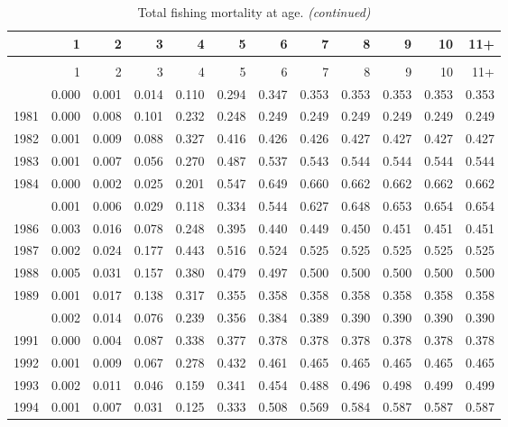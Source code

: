 \documentclass[
]{article}
\begin{document}
\begin{longtable}[t]{lrrrrrrrrrrr}
\caption{\label{tab:FAA-tot-table}Total fishing mortality at age.}\\
\toprule
  & 1 & 2 & 3 & 4 & 5 & 6 & 7 & 8 & 9 & 10 & 11+\\
\midrule
\endfirsthead
\caption[]{Total fishing mortality at age. \textit{(continued)}}\\
\toprule
  & 1 & 2 & 3 & 4 & 5 & 6 & 7 & 8 & 9 & 10 & 11+\\
\midrule
\endhead

\endfoot
\bottomrule
\endlastfoot
1980 & 0.000 & 0.001 & 0.014 & 0.110 & 0.294 & 0.347 & 0.353 & 0.353 & 0.353 & 0.353 & 0.353\\
1981 & 0.000 & 0.008 & 0.101 & 0.232 & 0.248 & 0.249 & 0.249 & 0.249 & 0.249 & 0.249 & 0.249\\
1982 & 0.001 & 0.009 & 0.088 & 0.327 & 0.416 & 0.426 & 0.426 & 0.427 & 0.427 & 0.427 & 0.427\\
1983 & 0.001 & 0.007 & 0.056 & 0.270 & 0.487 & 0.537 & 0.543 & 0.544 & 0.544 & 0.544 & 0.544\\
1984 & 0.000 & 0.002 & 0.025 & 0.201 & 0.547 & 0.649 & 0.660 & 0.662 & 0.662 & 0.662 & 0.662\\
\addlinespace
1985 & 0.001 & 0.006 & 0.029 & 0.118 & 0.334 & 0.544 & 0.627 & 0.648 & 0.653 & 0.654 & 0.654\\
1986 & 0.003 & 0.016 & 0.078 & 0.248 & 0.395 & 0.440 & 0.449 & 0.450 & 0.451 & 0.451 & 0.451\\
1987 & 0.002 & 0.024 & 0.177 & 0.443 & 0.516 & 0.524 & 0.525 & 0.525 & 0.525 & 0.525 & 0.525\\
1988 & 0.005 & 0.031 & 0.157 & 0.380 & 0.479 & 0.497 & 0.500 & 0.500 & 0.500 & 0.500 & 0.500\\
1989 & 0.001 & 0.017 & 0.138 & 0.317 & 0.355 & 0.358 & 0.358 & 0.358 & 0.358 & 0.358 & 0.358\\
\addlinespace
1990 & 0.002 & 0.014 & 0.076 & 0.239 & 0.356 & 0.384 & 0.389 & 0.390 & 0.390 & 0.390 & 0.390\\
1991 & 0.000 & 0.004 & 0.087 & 0.338 & 0.377 & 0.378 & 0.378 & 0.378 & 0.378 & 0.378 & 0.378\\
1992 & 0.001 & 0.009 & 0.067 & 0.278 & 0.432 & 0.461 & 0.465 & 0.465 & 0.465 & 0.465 & 0.465\\
1993 & 0.002 & 0.011 & 0.046 & 0.159 & 0.341 & 0.454 & 0.488 & 0.496 & 0.498 & 0.499 & 0.499\\
1994 & 0.001 & 0.007 & 0.031 & 0.125 & 0.333 & 0.508 & 0.569 & 0.584 & 0.587 & 0.587 & 0.587\\

\end{longtable}
\end{document}

